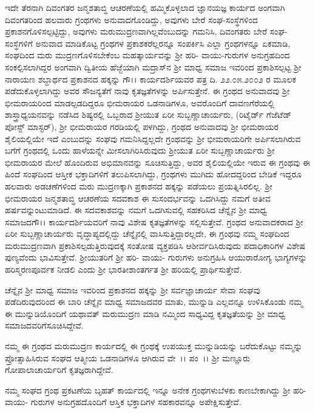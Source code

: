 ಇದೇ ತೆರನಾಗಿ ದಿವಂಗತರ ಜನ್ಮಶತಾಬ್ಧಿ ಆಚರಣೆಯಲ್ಲಿ ಹಮ್ಮಿಕೊಳ್ಳಲಾದ ಜ್ಞಾನಯಜ್ಞ ಕಾರ್ಯದ ಅಂಗವಾಗಿ ದಿವಂಗತರಿಂದ ಹಲವಾರು ಗ್ರಂಥಗಳು ಅನುವಾದಗೊಂಡಿದ್ದು, ಅವುಗಳು ಬೇರೆ ಸಂಘ-ಸಂಸ್ಥೆಗಳಿಂದ ಪ್ರಕಾಶನಗೊಳಿಸಲ್ಪಟ್ಟಿದ್ದು, ಅವುಗಳು ಮರುಮುದ್ರಣವಾಗಿಲ್ಲವೆಂಬುದನ್ನು ಗಮನಿಸಿ, ದಿವಂಗತರು ಬೇರೆ ಸಂಘ-ಸಂಸ್ಥೆಗಳಿಗೆ ಅನುವಾದ ಮಾಡಿಕೊಟ್ಟ ಗ್ರಂಥಗಳ ಪ್ರಕಾಶಕರೆಲ್ಲರನ್ನೂ ಸಂಪರ್ಕಿಸಿ ಎಲ್ಲಾ ಗ್ರಂಥಗಳನ್ನೂ ಏಕಮಾಡಿ, ಸಂಘದಿಂದ ಮರು ಮುದ್ರಣಗೊಳಿಸಬೇಕೆಂಬ ಮಹತ್ಕಾರ್ಯವನ್ನು ಶ‍್ರೀ ಹರಿ- ವಾಯು-\-ಗುರುಗಳ ಅನುಗ್ರಹದಿಂದ ಸಂಕಲ್ಪಿಸಲಾಗಿದ್ದರ ಅಂಗವಾಗಿ ದ್ವಿತೀಯ ಹೆಜ್ಜೆಯಾಗಿ ಮದ್ರಾಸ್‌ನ ಶ‍್ರೀ ಮಾಧ್ವ ಸಮಾಜ ಇವರಿಂದ ಪ್ರಕಾಶಿಸಲ್ಪಟ್ಟ ಶ‍್ರೀ ನಾರಾಯಣ ಶಬ್ದಾರ್ಥದ ಪ್ರಕಾಶನದ ಹಕ್ಕನ್ನು ಗೌ।। ಕಾರ್ಯದರ್ಶಿಯವರ ಪತ್ರ ದಿ. ೨೨.೦೫.೨೦೦೨ ರ ಮೂಲಕ ಪಡೆದುಕೊಳ್ಳಲಾಗಿದ್ದು ಅವರ ಸೌಜನ್ಯತೆಗೆ ನಾವು ಕೃತಜ್ಞತೆಗಳನ್ನು ಅರ್ಪಿಸುತ್ತೇನೆ. ಈ ಗ್ರಂಥದ ಅನುವಾದವು ಶ‍್ರೀ ಭೀಮರಾಯರಿಂದ ಮಾಡಲ್ಪಡದಿದ್ದರೂ ಭೀಮರಾಯರ ಒಡನಾಡಿಗಳೂ, ಅವರೊಂದಿಗೆ ದಾವಣಗೆರೆಯಲ್ಲಿ ಶಾಸ್ತ್ರಾಧ್ಯಯನವನ್ನು ನಡೆಸಿದ ಶಿಷ್ಯರಲ್ಲಿ ಒಬ್ಬರಾದ ಶ‍್ರೀಯುತ ಏರೀ ಸುಬ್ಬಣ್ಣಾಚಾರ್ಯರು, (ರಿಟೈರ್ಡ್ ಗೆಜೆಟೆಡ್ ಪೋಸ್ಟ್ ಮಾಸ್ಟರ್), ಶ‍್ರೀ ಭೀಮರಾಯರ ಗರಡಿಯಲ್ಲಿ ಪಳಗಿದ್ದು, ಗ್ರಂಥದ ಅನುವಾದವು ಶ‍್ರೀ ಭೀಮರಾಯರ ಶೈಲಿ\-ಯಲ್ಲಿಯೇ ಇದೆ ಎಂಬುದನ್ನು ಸಂಘವು ಗಮನಿಸಿದ್ದಲ್ಲದೇ ಗ್ರಂಥವನ್ನು ಶ‍್ರೀ ಭೀಮ\-ರಾಯರಿಗೇ ಅರ್ಪಿಸಲಾಗಿರುವ ಬಗೆಗೆ ಗ್ರಂಥದಲ್ಲಿ ಒಂದು ಹಾಳೆಯನ್ನೇ ಮೀಸಲಾಗಿರಿಸಿರುವುದು ಶ‍್ರೀಯುತ ಏರೀ ಸುಬ್ಬಣ್ಣಾಚಾರ್ಯರು ಶ‍್ರೀ ಭೀಮರಾಯರ ಮೇಲೆ ಹೊಂದಿರುವ ಅಭಿಮಾನವನ್ನು ಸೂಚಿಸುತ್ತಿದ್ದು, ಅವರ ಶೈಲಿಯಲ್ಲಿಯೇ ಇರುವ ಈ ಗ್ರಂಥವು ಈ ಹಿಂದೆ ಸಂಘದಿಂದ ಆಸ್ತೀಕ ಭಕ್ತಾದಿಗಳಿಗೆ ತಲುಪಿಸಲಾಗಿದ್ದು, ಗ್ರಂಥಗಳು ಮುಗಿದು ಹೋದದ್ದ\-ರಿಂದ ಬೇಡಿಕೆ ಇದ್ದರೂ ಹಲವಾರು ಅಡಚಣೆಗಳಿಂದ ಮರು ಮುದ್ರಣಕ್ಕಾಗಿ ಪ್ರಕಾಶನದ ಹಕ್ಕನ್ನು ಪಡೆಯಲು ಪ್ರಯತ್ನಿಸಿರಲಿಲ್ಲ. ಶ‍್ರೀ ಭೀಮರಾಯರ ಜನ್ಮಶತಾಬ್ಧಿ ಆಚರಣೆಯ ಸದವಕಾಶ ಈ ಸುಸಂದರ್ಭವನ್ನು ಒದಗಿಸಿದ್ದು ನಮಗೆ ಅತೀವ ಹರ್ಷವನ್ನುಂಟುಮಾಡಿದೆ. ಈ ಸದವಕಾಶವನ್ನು ನಮಗೆ ಒದಗಿಸುವಲ್ಲಿ ಸಹಕರಿಸಿದ ಚೆನ್ನೈನ ಶ‍್ರೀ ಮಾಧ್ವ ಸಮಾಜದ\break ಗೌ।। ಕಾರ್ಯದರ್ಶಿ\-ಯವರಿಗೆ ನಾವು ವಿಶೇಷ ಕೃತಜ್ಞತೆಗಳನ್ನು ಸಲ್ಲಿಸುತ್ತೇವೆ. ಗ್ರಂಥದ ಅನುವಾದಕರಾದ ಶ‍್ರೀ ಏರೀ ಸುಬ್ಬಣ್ಣಾಚಾರ್ಯರು ವೃದ್ಧಾಪ್ಯದಲ್ಲಿದ್ದು ಚೆನ್ನೈನಲ್ಲಿ ವಾಸಿಸುತ್ತಿದ್ದಾರಲ್ಲದೇ, ಈ ಗ್ರಂಥವು ನಮ್ಮ ಸಂಘದಿಂದ ಮರುಮುದ್ರಣವಾಗಿ ಪ್ರಕಾಶಿಸಲ್ಪಡುತ್ತಿರುವುದಕ್ಕೆ ಸಂತೋಷ ವ್ಯಕ್ತಪಡಿಸಿ ಆಶೀರ್ವದಿಸಿರುವುದು ಪದಾಧಿಕಾರಿಗಳ ವಿಶೇಷ ಪುಣ್ಯವೆಂದು ಭಾವಿಸುತ್ತೇವೆ. ಶ‍್ರೀಯುತರಿಗೆ ಶ‍್ರೀ ಹರಿ- ವಾಯು- ಗುರುಗಳು ಅನುಗ್ರಹಿಸಿ ಆಯುರಾರೋಗ್ಯ ಭಾಗ್ಯಗಳನ್ನು ಹರಿಸ್ಮರಣಪೂರ್ವಕ ನೀಡಲಿ ಎಂದು ಶ‍್ರೀ ಭಾರತೀಶಾಂತರ್ಗತ ಶ‍್ರೀ ಹರಿಯಲ್ಲಿ ಪ್ರಾರ್ಥಿಸುತ್ತೇವೆ.

ಚೆನ್ನೈನ ಶ‍್ರೀ ಮಾಧ್ವ ಸಮಾಜ ಇವರಿಂದ ಪ್ರಕಾಶನದ ಹಕ್ಕನ್ನು ಶ‍್ರೀ ಸರ್ವಜ್ಞಾಚಾರ್ಯ ಸೇವಾ ಸಂಘವು ಪಡೆದಿರುವುದರಿಂದ ಈ ಬಾರಿ ಚೆನ್ನೈನ ಮಾಧ್ವ ಸಮಾಜದವರ ಮಾತು, ಮುನ್ನುಡಿ ಎಲ್ಲವನ್ನೂ ಉಳಿಸಿಕೊಂಡು ನಮ್ಮ ಈ ಮುನ್ನುಡಿಯೊಂದಿಗೆ ಯಥಾವತ್ ಮರುಮುದ್ರಣ ಮಾಡಿ ನಮ್ಮಿಂದ ಸಾಧ್ಯವಿದ್ದ ಕೃತಜ್ಞತೆಯನ್ನು ಶ‍್ರೀ ಮಾಧ್ವ ಸಮಾಜದವರಿಗೆ\break ಸೂಚಿಸಿದ್ದೇವೆ.

ನಮ್ಮ ಈ ಗ್ರಂಥದ ಮರುಮುದ್ರಣ ಕಾರ್ಯದಲ್ಲಿ ಈ ಗ್ರಂಥಕ್ಕೆ ಉಪಯುಕ್ತ ಮುನ್ನುಡಿಯನ್ನು ಬರೆದುಕೊಟ್ಟು ನಮ್ಮನ್ನು ಪ್ರೋತ್ಸಾಹಿಸಿರುವ ಸಂಘದ ಆತ್ಮೀಯ ಒಡನಾಡಿಗಳೂ ಆಗಿರುವ ವೇ~।। ಪಂ~।। ಶ‍್ರೀ ಮಣ್ಣೂರು ಗೋಪಾಲಾಚಾರ್ಯರಿಗೆ ಕೃತಜ್ಞರಾಗಿದ್ದೇವೆ.

ನಮ್ಮ ಸಂಘದ ಗ್ರಂಥ ಪ್ರಕಟಣೆಯ ಬೃಹತ್ ಕಾರ್ಯದಲ್ಲಿ ಇನ್ನೂ ಅನೇಕ ಗ್ರಂಥಗಳು\break ಬೆಳಕು ಕಾಣಬೇಕಾಗಿದ್ದು ಶ‍್ರೀ ಹರಿ- ವಾಯು- ಗುರುಗಳ ಅನುಗ್ರಹದೊಂದಿಗೆ ಆಸ್ತಿಕ ಭಕ್ತಾದಿಗಳ ಸಹಕಾರವನ್ನೂ ಅಪೇಕ್ಷಿಸುತ್ತೇವೆ.

